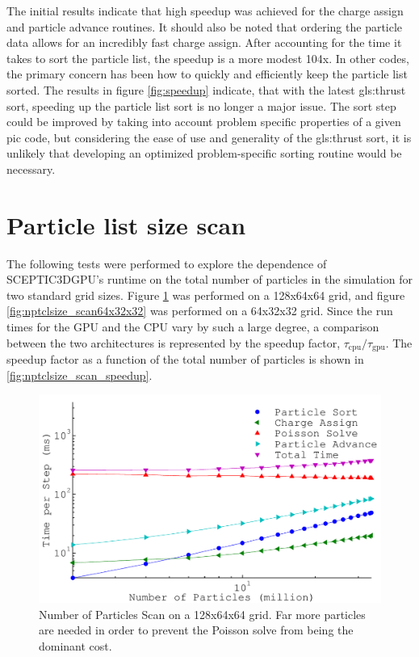 The initial results indicate that high speedup was achieved for the charge assign and particle advance routines. It should also be noted that ordering the particle data allows for an incredibly fast charge assign. After accounting for the time it takes to sort the particle list, the speedup is a more modest 104x. In other codes, the primary concern has been how to quickly and efficiently keep the particle list sorted. The results in figure \ref{fig:speedup} indicate, that with the latest \gls{gls:thrust} sort, speeding up the particle list sort is no longer a major issue. The sort step could be improved by taking into account problem specific properties of a given pic code, but considering the ease of use and generality of the \gls{gls:thrust} sort, it is unlikely that developing an optimized problem-specific sorting routine would be necessary. 



	
	\section{Particle list size scan}
The following tests were performed to explore the dependence of SCEPTIC3DGPU's runtime on the total number of particles in the simulation for two standard grid sizes. Figure \ref{fig:nptclsize_scan128x64x64} was performed on a 128x64x64 grid, and figure \ref{fig:nptclsize_scan64x32x32} was performed on a 64x32x32 grid. Since the run times for the GPU and the CPU vary by such a large degree, a comparison between the two architectures is represented by the speedup factor, $\tau_{\mathrm{cpu}}/\tau_{\mathrm{gpu}}$. The speedup factor as a function of the total number of particles is shown in \ref{fig:nptclsize_scan_speedup}.

\begin{figure}
\begin{center}
\includegraphics[width=6in]{performance/nptclsize_scan128x64x64ons8bins.pdf}
\end{center}
\caption[Number of Particles Scan on a 128x64x64 grid]{Number of Particles Scan on a 128x64x64 grid. Far more particles are needed in order to prevent the Poisson solve from being the dominant cost.}
\label{fig:nptclsize_scan128x64x64}
\end{figure}

